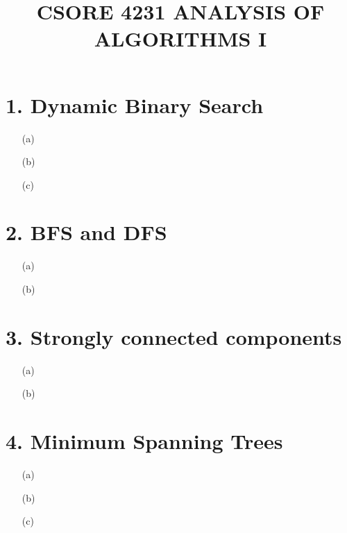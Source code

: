 \documentclass{article}
\title{CSORE 4231 ANALYSIS OF ALGORITHMS I \exerciseset}
\author{\studentname  \qquad \suid}
\begin{document}
\maketitle

\section*{1. Dynamic Binary Search}
\begin{enumerate}
    \item[(a)] 
    \item[(b)] 
    \item[(c)] 
\end{enumerate}

\section*{2. BFS and DFS}
\begin{enumerate}
    \item[(a)] 
    \item[(b)] 
\end{enumerate}

\section*{3. Strongly connected components}
\begin{enumerate}
    \item[(a)] 
    \item[(b)] 
\end{enumerate}

\section*{4. Minimum Spanning Trees}
\begin{enumerate}
    \item[(a)] 
    \item[(b)] 
    \item[(c)] 

\end{enumerate}
\end{document}
